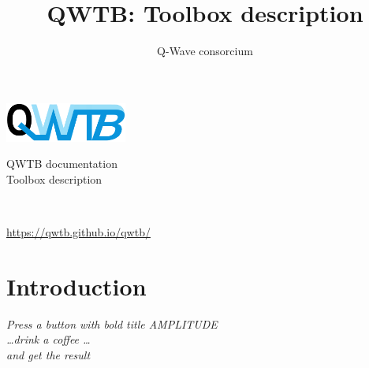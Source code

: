 \documentclass[12pt,a4paper,oneside]{report} %
\begin{document}
\renewcommand\floatpagefraction{.9} \renewcommand\topfraction{.9} \renewcommand\bottomfraction{.9} \renewcommand\textfraction{.1} \setcounter{totalnumber}{50} \setcounter{topnumber}{50} \setcounter{bottomnumber}{50} %
\renewcommand{\labelitemi}{--}          %
\setlength{\unitlength}{1mm}            %

\newenvironment{tightdesc}{\begin{description}[itemsep=0pt]} 
                              {\end{description}}

\def\infosection{Description}
\def\examplesection{Example}
\renewcommand{\chaptername}{}

\title{QWTB: Toolbox description}
\author{Q-Wave consorcium}

\thispagestyle{empty}
\begin{center}
        \vspace*{10em}
        {\huge
        \includegraphics[width=0.3\textwidth]{logo/qwtb_logo.pdf}

        \vspace{2.0em}
        QWTB documentation\\

        \vspace{1.5em}
        Toolbox description}\\

        \vfill
        {\Large \color{red}{QWTB version 0.1}}

        \vspace{1em}
        {\Large \url{https://qwtb.github.io/qwtb/}}
\end{center}
\newpage

\tableofcontents

\chapter{Introduction} %
\bigskip
\begin{center}
        \parbox{0.7\textwidth}{\textit{Press a button with bold title AMPLITUDE\\
        \dots drink a coffee \dots\\
        and get the result}}
\end{center}
\end{document}
